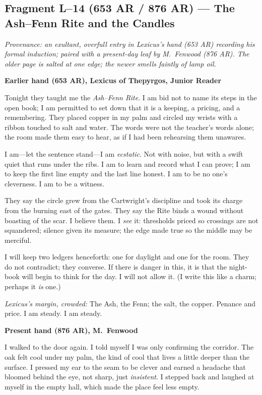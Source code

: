 \documentclass[11pt]{article}
\begin{document}
\subsection{Fragment L--14 (653 AR / 876 AR) --- The Ash--Fenn Rite and the Candles}
\label{frag:l14}
{}

\noindent\textit{Provenance: an exultant, overfull entry in Lexicus’s hand (653 AR) recording his formal induction; paired with a present-day leaf by M.\ Fenwood (876 AR). The older page is salted at one edge; the newer smells faintly of lamp oil.}

\medskip
\noindent\textbf{Earlier hand (653 AR), Lexicus of Thepyrgos, Junior Reader}

Tonight they taught me the \textit{Ash--Fenn Rite}. I am bid not to name its steps in the open book; I am permitted to set down that it is a keeping, a pricing, and a remembering. They placed copper in my palm and circled my wrists with a ribbon touched to salt and water. The words were not the teacher’s words alone; the room made them easy to hear, as if I had been rehearsing them unawares.

I am—let the sentence stand—I am \emph{ecstatic}. Not with noise, but with a swift quiet that runs under the ribs. I am to learn and record what I can prove; I am to keep the first line empty and the last line honest. I am to be no one’s cleverness. I am to be a witness.

They say the circle grew from the Cartwright’s discipline and took its charge from the burning east of the gates. They say the Rite binds a wound without boasting of the scar. I believe them. I \emph{see} it: thresholds priced so crossings are not squandered; silence given its measure; the edge made true so the middle may be merciful.

I will keep two ledgers henceforth: one for daylight and one for the room. They do not contradict; they converse. If there is danger in this, it is that the night-book will begin to think for the day. I will not allow it. (I write this like a charm; perhaps it \emph{is} one.)

\medskip
\noindent\textit{Lexicus’s margin, crowded:} The Ash, the Fenn; the salt, the copper. Penance and price. I am steady. I am steady.

\medskip
\noindent\textbf{Present hand (876 AR), M.\ Fenwood}

I walked to the door again. I told myself I was only confirming the corridor. The oak felt cool under my palm, the kind of cool that lives a little deeper than the surface. I pressed my ear to the seam to be clever and earned a headache that bloomed behind the eye, not sharp, just \emph{insistent}. I stepped back and laughed at myself in the empty hall, which made the place feel less empty.
\end{document}
